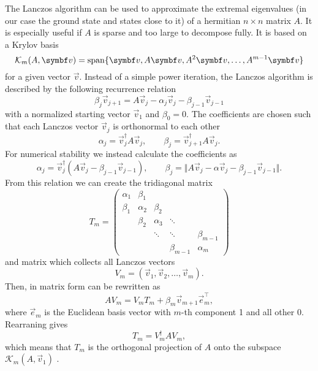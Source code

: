 The Lanczos algorithm \cite{Lanczos1950} can be used to approximate the extremal eigenvalues
(in our case the ground state and states close to it)
of a hermitian $n\times n$ matrix $A$.
It is especially useful if $A$ is sparse and too large to decompose fully.
It is based on a Krylov basis
\begin{equation}
    \mathcal{K}_m(A, \vec{v}) = \spn\{\vec{v}, A\vec{v}, A^2\vec{v}, \ldots, A^{m-1}\vec{v}\}
\end{equation}
for a given vector $\vec{v}$.
Instead of a simple power iteration, the Lanczos algorithm is described by the
following recurrence relation
\begin{equation}
    \beta_j\vec{v}_{j+1} = A\vec{v}_j - \alpha_j\vec{v}_j - \beta_{j-1}\vec{v}_{j-1}
    \label{eq:Lanczos-recurrence}
\end{equation}
with a normalized starting vector $\vec{v}_1$ and $\beta_0 = 0$.
The coefficients are chosen such that each Lanczos vector $\vec{v}_j$ is orthonormal to each other
\begin{equation}
    \alpha_j = \vec{v}_j^\dag A \vec{v}_j,
    \qquad
    \beta_j = \vec{v}_{j+1}^\dag A\vec{v}_j.
\end{equation}
For numerical stability \cite{Paige1972, Paige1976}
we instead calculate the coefficients as
\begin{equation}
    \alpha_j = \vec{v}_j^\dag( A \vec{v}_j - \beta_{j-1}\vec{v}_{j-1}),
    \qquad
    \beta_j = \Vert A\vec{v}_j - \alpha\vec{v}_j -  \beta_{j-1}\vec{v}_{j-1} \Vert.
\end{equation}
From this relation we can create the tridiagonal matrix
\begin{equation}
    T_m
    =
    \begin{pmatrix}
        \alpha_1 & \beta_1  &          &             &             \\
        \beta_1  & \alpha_2 & \beta_2  &             &             \\
                 & \beta_2  & \alpha_3 & \ddots      &             \\
                 &          & \ddots   & \ddots      & \beta_{m-1} \\
                 &          &          & \beta_{m-1} & \alpha_m
    \end{pmatrix}
\end{equation}
and matrix which collects all Lanczos vectors
\begin{equation}
    V_m = (\vec{v}_1, \vec{v}_2, \ldots, \vec{v}_m).
\end{equation}
Then,  in matrix form can be rewritten as
\begin{equation}
    A V_m = V_m T_m + \beta_{m}\vec{v}_{m+1}\vec{e}_{m}^\intercal,
\end{equation}
where $\vec{e}_m$ is the Euclidean basis vector with $m$-th component 1 and all other 0.
Rearraning gives
\begin{equation}
    T_m = V_m^\dag A V_m,
\end{equation}
which means that $T_m$ is the orthogonal projection of $A$ onto
the subspace $\mathcal{K}_m(A, \vec{v}_1)$ \cite{Cullum1985}.

